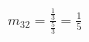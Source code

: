 \documentclass[preview]{standalone}
\begin{document}
\begin{align*}
m_{32} = \frac{\frac{1}{3}}{\frac{5}{3}} = \frac{1}{5}
\end{align*}
\end{document}

